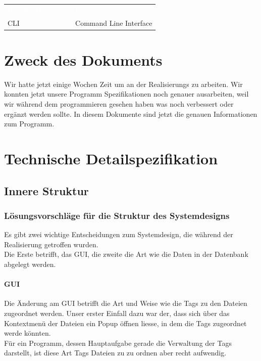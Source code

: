 \documentclass[10pt,paper=a4,final]{scrartcl}
\begin{document}
\begin{tabularx}{\textwidth}{l X}
\textcolor{white}{Begriff/ Abkürzung}\cellcolor{blue!80!} & \textcolor{white}{Bedeutung}\cellcolor{blue!80!} \\
CLI \cellcolor{blue!20!} & Command Line Interface\cellcolor{blue!20!} \\
\end{tabularx}
\newline
\newline
\newline

{}
\flushleft
\newpage
\tableofcontents
\newpage
\section{Zweck des Dokuments}
Wir hatte jetzt einige Wochen Zeit um an der Realisierungs zu arbeiten. Wir konnten jetzt unsere Programm Spezifikationen noch genauer ausarbeiten, weil wir während dem programmieren gesehen haben was noch verbessert oder ergänzt werden sollte. In diesem Dokumente sind jetzt die genauen Informationen zum Programm.
\section{Technische Detailspezifikation}
\subsection{Innere Struktur}
\subsubsection{L\"osungsvorschl\"age f\"ur die Struktur des Systemdesigns}
Es gibt zwei wichtige Entscheidungen zum Systemdesign, die w\"ahrend der Realisierung getroffen wurden.\\
Die Erste betrifft, das GUI, die zweite die Art wie die Daten in der Datenbank abgelegt werden.
\paragraph{GUI}
Die \"Anderung am GUI betrifft die Art und Weise wie die Tags zu den Dateien zugeordnet werden. Unser erster Einfall dazu war der, dass sich \"uber das Kontextmen\"u der Dateien ein Popup \"offnen liesse, in dem die Tags zugeordnet werde k\"onnten.\\
F\"ur ein Programm, dessen Hauptaufgabe gerade die Verwaltung der Tags darstellt, ist diese Art Tags Dateien zu zu ordnen aber recht aufwendig.
\end{document}
